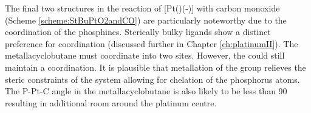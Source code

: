 The final two structures in the reaction of [Pt(\tButhixantphos)(-)] with carbon monoxide (Scheme \ref{scheme:StBuPtO2andCO}) are particularly noteworthy due to the \cis{} coordination of the phosphines.  Sterically bulky ligands show a distinct preference for \trans{} coordination (discussed further in Chapter \ref{ch:platinumII}).  The metallacyclobutane must coordinate into two \cis{} sites. However, the \tBuxantphos{} could still maintain a \trans{} coordination.  It is plausible that metallation of the \tBu{} group relieves the steric constraints of the system allowing for \cis{} chelation of the phosphorus atoms.  The P-Pt-C angle in the metallacyclobutane is also likely to be less than 90\degrees{} resulting in additional room around the platinum centre.  


